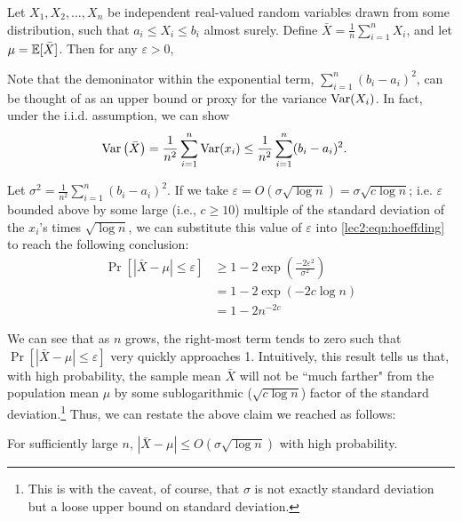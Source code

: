 \begin{theorem}
    Let $X_1, X_2, \dots, X_n$ be independent real-valued random variables drawn from some distribution, such that $a_i \leq X_i \leq b_i$ almost surely. Define $\bar{X} = \frac{1}{n}\sum_{i=1}^n X_i$, and let $\mu = \mathbb{E} [\bar{X}]$. Then for any $\varepsilon > 0$,
\end{theorem}

Note that the demoninator within the exponential term, $\sum_{i=1}^n (b_i - a_i)^2$, can be thought of as an upper bound or proxy for the variance $\operatorname{Var}(X_i)$. In fact, under the i.i.d. assumption, we can show
\begin{align}
    \operatorname{Var}\left(\bar{X} \right) &= \frac{1}{n^2}\sum_{i=1}^n \operatorname{Var}(x_i) \leq \frac{1}{n^2}\sum_{i=1}^n (b_i - a_i)^2.
\end{align}

Let $\sigma^2 = \frac{1}{n^2}\sum_{i=1}^n (b_i - a_i)^2$. If we take $\varepsilon = O(\sigma \sqrt{\log{n}}) = \sigma \sqrt{c \log n}$; i.e. $\varepsilon$ bounded above by some large (i.e., $c \geq 10$) multiple of the standard deviation of the $x_i$'s times $\sqrt{\log{n}}$, we can substitute this value of $\varepsilon$ into \eqref{lec2:eqn:hoeffding} to reach the following conclusion: 
\begin{align}
    \Pr \left[ |\bar{X} - \mu| \leq \varepsilon \right] &\geq 1 - 2\exp\left(\frac{-2 \varepsilon^2}{\sigma^2}\right)\\
    &= 1 - 2 \exp(-2 c \log n)\\
    &= 1 - 2 n^{-2c}
\end{align}

We can see that as $n$ grows, the right-most term tends to zero such that $\Pr[|\bar{X} - \mu| \leq \varepsilon]$ very quickly approaches 1. Intuitively, this result tells us that, with high probability, the sample mean $\bar{X}$ will not be ``much farther" from the population mean $\mu$ by some sublogarithmic ($\sqrt{c \log n}$) factor of the standard deviation.\footnote{This is with the caveat, of course, that $\sigma$ is not exactly standard deviation but a loose upper bound on standard deviation.} Thus, we can restate the above claim we reached as follows:

\begin{remark}
    For sufficiently large $n$, $|\bar{X} - \mu | \leq O(\sigma \sqrt{\log{n}})$ with high probability.
\end{remark}

